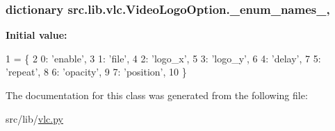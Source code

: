 \subsubsection[{\+\_\+enum\+\_\+names\+\_\+}]{\setlength{\rightskip}{0pt plus 5cm}dictionary src.\+lib.\+vlc.\+Video\+Logo\+Option.\+\_\+enum\+\_\+names\+\_\+\hspace{0.3cm}{\ttfamily [static]}, {\ttfamily [private]}}\label{classsrc_1_1lib_1_1vlc_1_1VideoLogoOption_ac64c121a5e6196560c51e4ae1e6b0c77}
{\bfseries Initial value\+:}
\begin{DoxyCode}
1 = \{
2         0: \textcolor{stringliteral}{'enable'},
3         1: \textcolor{stringliteral}{'file'},
4         2: \textcolor{stringliteral}{'logo\_x'},
5         3: \textcolor{stringliteral}{'logo\_y'},
6         4: \textcolor{stringliteral}{'delay'},
7         5: \textcolor{stringliteral}{'repeat'},
8         6: \textcolor{stringliteral}{'opacity'},
9         7: \textcolor{stringliteral}{'position'},
10     \}
\end{DoxyCode}


The documentation for this class was generated from the following file\+:\begin{DoxyCompactItemize}
\item 
src/lib/\hyperlink{vlc_8py}{vlc.\+py}\end{DoxyCompactItemize}
